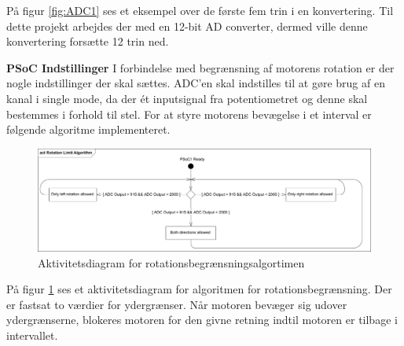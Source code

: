 \noindent På figur \ref{fig:ADC1} ses et eksempel over de første fem trin i en konvertering. Til dette projekt arbejdes der med en 12-bit AD converter, dermed ville denne konvertering forsætte 12 trin ned.  \newline

\noindent \textbf{PSoC Indstillinger} \newline
I forbindelse med begrænsning af motorens rotation er der nogle indstillinger der skal sættes. ADC'en skal indstilles til at gøre brug af en kanal i single mode, da der ét inputsignal fra potentiometret og denne skal bestemmes i forhold til stel. For at styre motorens bevægelse i et interval er følgende algoritme implementeret.

\begin{figure}[H]
	\centering
	\includegraphics[width=\textwidth]{DesignOgImplementering/images/rotationalgorithm}
	\caption{Aktivitetsdiagram for rotationsbegrænsningsalgortimen}
	\label{fig:rotation}
	
\end{figure}

\noindent På figur \ref{fig:rotation} ses et aktivitetsdiagram for algoritmen for rotationsbegrænsning. Der er fastsat to værdier for ydergrænser. Når motoren bevæger sig udover ydergrænserne, blokeres motoren for den givne retning indtil motoren er tilbage i intervallet. 
